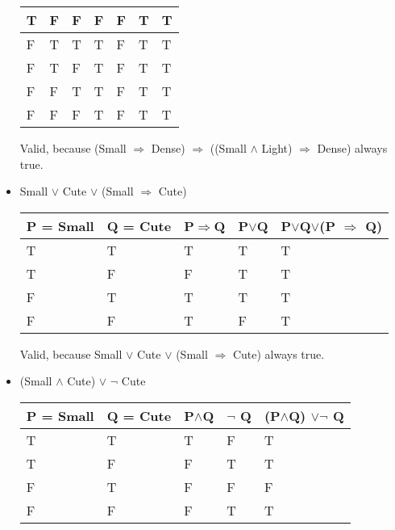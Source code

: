 \documentclass{article}
\begin{document}
\begin{itemize}
\begin{center}
\begin{tabular}{ |l|l|l|l|l|l|l|}
        T & F &F&F&F&T&T\\ \hline
        F & T &T&T&F&T&T\\ \hline
        F & T &F&T&F&T&T\\ \hline
        F & F &T&T&F&T&T\\ \hline
        F & F &F&T&F&T&T\\ \hline
      \end{tabular}
      \end{center}
      Valid, because (Small $\Rightarrow$ Dense) $\Rightarrow$ ((Small $\wedge$ Light) $\Rightarrow$ Dense) always true.
    \item Small $\vee$ Cute $\vee$ (Small $\Rightarrow$ Cute)
    \begin{center}
      \begin{tabular}{ |l|l|l|l|l|}
        \hline
        P = Small  &  Q = Cute  & P$\Rightarrow$Q & P$\vee$Q & P$\vee$Q$\vee$(P $\Rightarrow$ Q) \\ \hline
        T & T &T&T&T\\ \hline
        T & F &F&T&T\\ \hline
        F & T &T&T&T\\ \hline
        F & F &T&F&T\\ \hline

      \end{tabular}
      \end{center}
      Valid, because Small $\vee$ Cute $\vee$ (Small $\Rightarrow$ Cute) always true.
    \item (Small $\wedge$ Cute) $\vee$ $\neg$ Cute
    \begin{center}
      \begin{tabular}{ |l|l|l|l|l|}
        \hline
        P =  Small &  Q = Cute & P$\wedge$Q & $\neg$ Q   &(P$\wedge$Q) $\vee$$\neg$ Q\\ \hline

        T & T &T&F&T\\ \hline
        T & F &F&T&T\\ \hline
        F & T &F&F&F\\ \hline
        F & F &F&T&T\\ \hline


\end{tabular}
\end{center}
\end{itemize}
\end{document}
